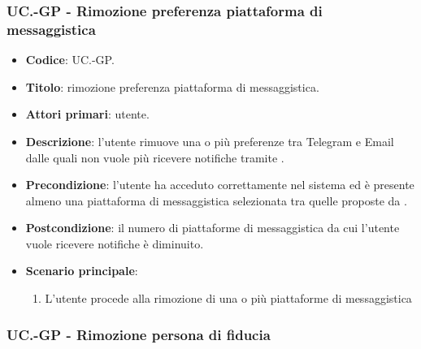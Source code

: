 	\subsubsection{UC\theuccount.\thesubuccount-GP - Rimozione preferenza piattaforma di messaggistica}
	
	\begin{itemize}
		\item \textbf{Codice}: UC\theuccount.\thesubuccount-GP.
		\item \textbf{Titolo}: rimozione preferenza piattaforma di messaggistica.
		\item \textbf{Attori primari}: utente.
		\item \textbf{Descrizione}: l’utente rimuove una o più preferenze tra Telegram e Email dalle	quali non vuole più ricevere notifiche tramite \progetto.
		\item \textbf{Precondizione}: l’utente ha acceduto correttamente nel sistema ed è presente almeno una piattaforma di messaggistica selezionata tra quelle proposte da \progetto.
		\item \textbf{Postcondizione}: il numero di piattaforme di messaggistica da cui l’utente vuole ricevere notifiche è diminuito.
		\item \textbf{Scenario principale}:
		\begin{enumerate}
			\item L'utente procede alla rimozione di una o più piattaforme di messaggistica
		\end{enumerate}
	\end{itemize}
	
	\subsubsection{UC\theuccount.\thesubuccount-GP - Rimozione persona di fiducia}
	
